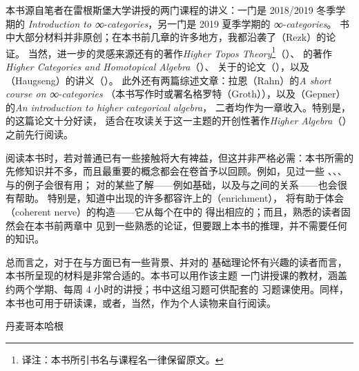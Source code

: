 本书源自笔者在雷根斯堡大学讲授的两门课程的讲义：一门是 2018/2019 冬季学期的
\emph{Introduction to ∞-categories}，另一门是 2019 夏季学期的 \emph{∞-categories}。
书中大部分材料并非原创；在本书前几章的许多地方，我都沿袭了\trRezk{}（Rezk）的论证\cite{Rez20}。
当然，进一步的灵感来源还有\trLurie{}的著作\emph{Higher Topos Theory}\footnote{译注：本书所引书名与课程名一律保留原文。}（\cite{Lur09}）、
\trCisinski{}的著作\emph{Higher Categories and Homotopical Algebra}（\cite{Cis19}）、
\trJoyal{}关于\trQuasiCategory{}的论文（\cite{Joy08}），以及%
\trHaugseng{}（Haugseng）的\trInfinityCategories{}讲义（\cite{Hau17}）。
此外还有两篇综述文章：拉恩（Rahn）的\emph{A short course on ∞-categories}
（本书写作时或署名格罗特（Groth）），以及\trGepner{}（Gepner）的\emph{An introduction to higher categorical algebra}，
二者均作为一章收入\cite{Mil19}。特别是，\trGepner{}的这篇论文十分好读，
适合在攻读\trLurie{}关于这一主题的开创性著作\emph{Higher Algebra}（\cite{Lur17}）之前先行阅读。

阅读本书时，若对普通\trCategoryTheory{}已有一些接触将大有裨益，但这并非严格必需：本书所需的
先修知识并不多，而且最重要的概念都会在卷首予以回顾。例如，见过一些%
\trCategory{}、\trFunctor{}、\trAdjunction{}、\trColimit{}与\trLimit{}的例子会很有用；
对\trAlgebraicTopology{}的某些了解——例如基础\trHomotopyTheory{}，以及\trTopologicalSpace{}与\trSimplicialSets{}之间的关系——也会很有帮助。
特别是，知道\trAlgebraicTopology{}中出现的许多\trCategory{}都容许\trTopologicalSpace{}上的\trEnrichment{}（enrichment），
将有助于体会\trCoherentNerve{}（coherent nerve）的构造——它从每个在\trTopologicalSpace{}中\trEnrichment{}的\trCategory{}%
得出相应的\trInfinityCategory{}；而且，熟悉\trModelCategory{}的读者固然会在本书前两章中
见到一些熟悉的论证，但要跟上本书的推理，并不需要任何\trModelCategory{}的知识。

总而言之，对于在\trHomotopyTheory{}与\trCategoryTheory{}方面已有一些背景、并对\trInfinityCategories{}的
基础理论怀有兴趣的读者而言，本书所呈现的材料是非常合适的。本书可以用作该主题
一门讲授课的教材，涵盖约两个学期、每周 4 小时的讲授；书中这组习题可供配套的
习题课使用。同样，本书也可用于研读课，或者，当然，作为个人读物来自行阅读。

丹麦哥本哈根\hfill\trLand
